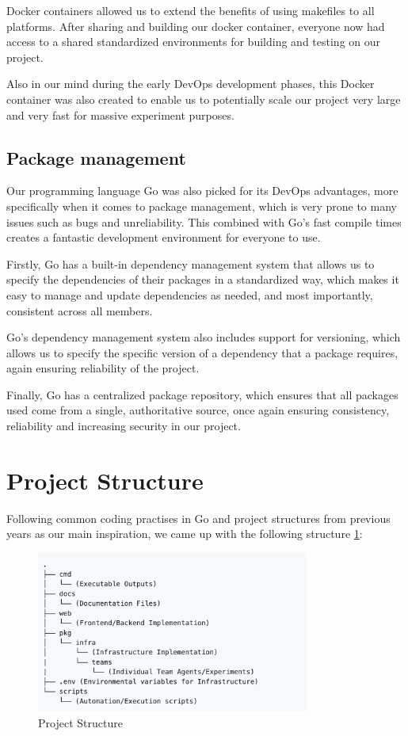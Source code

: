 Docker containers allowed us to extend the benefits of using makefiles to all platforms. After sharing and building our docker container, everyone now had access to a shared standardized environments for building and testing on our project. 

Also in our mind during the early DevOps development phases, this Docker container was also created to enable us to potentially scale our project very large and very fast for massive experiment purposes.


\subsection{Package management}

Our  programming language Go was also picked for its DevOps advantages, more specifically when it comes to package management, which is very prone to many issues such as bugs and unreliability. This combined with Go's fast compile times creates a fantastic development environment for everyone to use. 

Firstly, Go has a built-in dependency management system that allows us to specify the dependencies of their packages in a standardized way, which makes it easy to manage and update dependencies as needed, and most importantly, consistent across all members. 

Go's dependency management system also includes support for versioning, which allows us to specify the specific version of a dependency that a package requires, again ensuring reliability of the project.

Finally, Go has a centralized package repository, which ensures that all packages used come from a single, authoritative source,  once again ensuring consistency, reliability and increasing security in our project.

\newpage

\section{Project Structure}

Following common coding practises in Go and project structures from previous years as our main inspiration, we came up with the following structure \ref{fig:proj_struct}:

\begin{figure}[h]
    \centering
    \includegraphics[width=0.8\textwidth]{figures/proj_struct.png}
    \caption{Project Structure}
    \label{fig:proj_struct}
\end{figure}